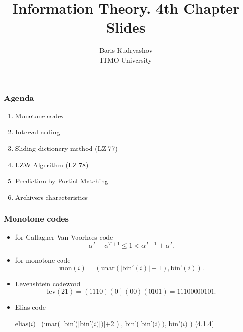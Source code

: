 \documentclass[14pt]{beamer}
\title{\small{Information Theory. 4th Chapter Slides}}
\author{\huge{
Boris Kudryashov \\
\vspace{30pt}
ITMO University
}}
\begin{document}
\maketitle

\begin{frame}
\frametitle{Agenda}
\begin{enumerate}    

    \item Monotone codes
    \item Interval coding
    \item Sliding dictionary method (LZ-77)
    \item LZW Algorithm (LZ-78)
    \item Prediction by Partial Matching
    \item Archivers characteristics


\end{enumerate}
\end{frame}


\begin{frame}
\frametitle{Monotone codes}
\begin{itemize}    

    \item for Gallagher-Van Voorhees code
    \begin{equation}
    \label{eq4_1} \alpha ^T +  \alpha ^{T + 1} \le 1 < \alpha ^{T - 1} +
    \alpha ^T.
    \end{equation}
    
    \item for monotone code
    \begin{equation}
    \label{eq4_2} %
    \mbox{mon}(i) =\left( \mbox{unar} \left(\left| \mbox{bin}'(i)
    \right| + 1 \right),\mbox{bin}'(i) \right).
    \end{equation}
    
    \item Levenshtein codeword
    \[\mbox{lev}(21)=(1110)(0)(00)(0101)= 11100000101.\]
    
    
    \item Elias code
    \begin{flushright}
    elias($i)$=(unar( $\vert $bin\textsf{'($\vert
    $}bin\textsf{'}($i)$\textsf{$\vert )$}$\vert $+2 ) , bin\textsf{'($\vert
    $}bin\textsf{'}($i)$\textsf{$\vert )$, }bin\textsf{'}($i)$ )\textsf{ (}4.1.4)
    \end{flushright}
    
\end{itemize}
\end{frame}
\end{document}
